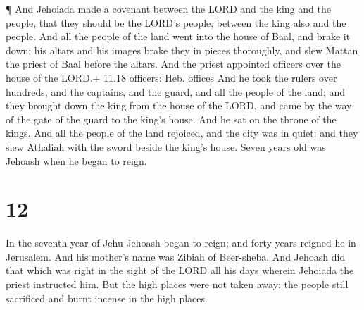  ¶ And Jehoiada made a covenant between the LORD and the
king and the people, that they should be the LORD's people; between the
king also and the people.  And all the people of the land
went into the house of Baal, and brake it down; his altars and his
images brake they in pieces thoroughly, and slew Mattan the priest of
Baal before the altars. And the priest appointed officers over the house
of the LORD.+ 11.18 officers: Heb. offices  And he took the
rulers over hundreds, and the captains, and the guard, and all the
people of the land; and they brought down the king from the house of the
LORD, and came by the way of the gate of the guard to the king's house.
And he sat on the throne of the kings.  And all the people
of the land rejoiced, and the city was in quiet: and they slew Athaliah
with the sword beside the king's house.  Seven years old
was Jehoash when he began to reign.

\hypertarget{section-11}{%
\section{12}\label{section-11}}

 In the seventh year of Jehu Jehoash began to reign; and
forty years reigned he in Jerusalem. And his mother's name was Zibiah of
Beer-sheba.  And Jehoash did that which was right in the
sight of the LORD all his days wherein Jehoiada the priest instructed
him.  But the high places were not taken away: the people
still sacrificed and burnt incense in the high places.

